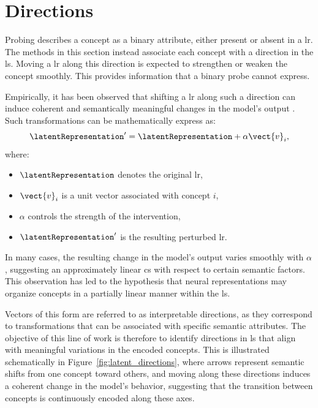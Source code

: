 \section{Directions}
\label{sec:directions}

Probing describes a concept as a binary attribute, either present or absent in a \gls{lr}.
The methods in this section instead associate each concept with a direction in the \gls{ls}.
Moving a \gls{lr} along this direction is expected to strengthen or weaken the concept smoothly.
This provides information that a binary probe cannot express.

Empirically, it has been observed that shifting a \gls{lr} along such a direction can induce coherent and semantically meaningful changes in the model's output \parencite{haas2024discovering, voynov2020unsuperviseddiscoveryinterpretabledirections}.
Such transformations can be mathematically express as:
\[
\latentRepresentation' = \latentRepresentation + \alpha \vect{v}_i,
\]
where:
\begin{itemize}
    \item $\latentRepresentation$ denotes the original \gls{lr},
    \item $\vect{v}_i$ is a unit vector associated with concept $i$,
    \item $\alpha$ controls the strength of the intervention,
    \item $\latentRepresentation'$ is the resulting perturbed \gls{lr}.
\end{itemize}

In many cases, the resulting change in the model's output varies smoothly with \(\alpha\), suggesting an approximately linear \gls{cs} with respect to certain semantic factors.
This observation has led to the hypothesis that neural representations may organize concepts in a partially linear manner within the \gls{ls}.

Vectors of this form are referred to as interpretable directions, as they correspond to transformations that can be associated with specific semantic attributes.
The objective of this line of work is therefore to identify directions in \gls{ls} that align with meaningful variations in the encoded concepts.
This is illustrated schematically in Figure~\ref{fig:latent_directions}, where arrows represent semantic shifts from one concept toward others, and moving along these directions induces a coherent change in the model's behavior, suggesting that the transition between concepts is continuously encoded along these axes.

